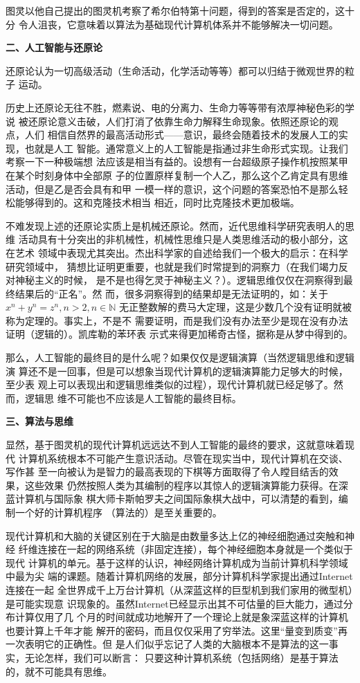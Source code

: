 图灵以他自己提出的图灵机考察了希尔伯特第十问题，得到的答案是否定的，这十分
令人沮丧，它意味着以算法为基础现代计算机体系并不能够解决一切问题。

\textbf{二、人工智能与还原论}

还原论认为一切高级活动（生命活动，化学活动等等）都可以归结于微观世界的粒子
运动。

历史上还原论无往不胜，燃素说、电的分离力、生命力等等带有浓厚神秘色彩的学说
被还原论意义击破，人们打消了依靠生命力解释生命现象。依照还原论的观点，人们
相信自然界的最高活动形式——意识，最终会随着技术的发展人工的实现，也就是人工
智能。通常意义上的人工智能是指通过非生命形式实现。让我们考察一下一种极端想
法应该是相当有益的。设想有一台超级原子操作机按照某甲在某个时刻身体中全部原
子的位置原样复制一个人乙，那么这个乙肯定具有思维活动，但是乙是否会具有和甲
一模一样的意识，这个问题的答案恐怕不是那么轻松能够得到的。这和克隆技术相当
相近，同时比克隆技术更加极端。

不难发现上述的还原论实质上是机械还原论。然而，近代思维科学研究表明人的思维
活动具有十分突出的非机械性，机械性思维只是人类思维活动的极小部分，这在艺术
领域中表现尤其突出。杰出科学家的自述给我们一个极大的启示：在科学研究领域中，
猜想比证明更重要，也就是我们时常提到的洞察力（在我们竭力反对神秘主义的时候，
是不是也得乞灵于神秘主义？）。逻辑思维仅仅在洞察得到最终结果后的“正名”。然
而，很多洞察得到的结果却是无法证明的，如：关于$x^n+y^n=z^n, n>2, n\in\mathbb{N}$
无正整数解的费马大定理，这是少数几个没有证明就被称为定理的。事实上，不是不
需要证明，而是我们没有办法至少是现在没有办法证明（逻辑的）。凯库勒的苯环表
示式来得更加稀奇古怪，据称是从梦中得到的。

那么，人工智能的最终目的是什么呢？如果仅仅是逻辑演算（当然逻辑思维和逻辑演
算还不是一回事，但是可以想象当现代计算机的逻辑演算能力足够大的时候，至少表
观上可以表现出和逻辑思维类似的过程），现代计算机就已经足够了。然而，逻辑思
维不可能也不应该是人工智能的最终目标。

\textbf{三、算法与思维}

显然，基于图灵机的现代计算机远远达不到人工智能的最终的要求，这就意味着现代
计算机系统根本不可能产生意识活动。尽管在现实当中，现代计算机在交谈、写作甚
至一向被认为是智力的最高表现的下棋等方面取得了令人瞠目结舌的效果，这些效果
仍然按照人类为其编制的程序以其惊人的逻辑演算能力获得。在深蓝计算机与国际象
棋大师卡斯帕罗夫之间国际象棋大战中，可以清楚的看到，编制一个好的计算机程序
（算法的）是至关重要的。

现代计算机和大脑的关键区别在于大脑是由数量多达上亿的神经细胞通过突触和神经
纤维连接在一起的网络系统（非固定连接），每个神经细胞本身就是一个类似于现代
计算机的单元。基于这样的认识，神经网络计算机成为当前计算机科学领域中最为尖
端的课题。随着计算机网络的发展，部分计算机科学家提出通过Internet连接在一起
全世界成千上万台计算机（从深蓝这样的巨型机到我们家用的微型机）是可能实现意
识现象的。虽然Internet已经显示出其不可估量的巨大能力，通过分布计算仅用了几
个月的时间就成功地解开了一个理论上就是象深蓝这样的计算机也要计算上千年才能
解开的密码，而且仅仅采用了穷举法。这里“量变到质变”再一次表明它的正确性。但
是人们似乎忘记了人类的大脑根本不是算法的这一事实，无论怎样，我们可以断言：
只要这种计算机系统（包括网络）是基于算法的，就不可能具有思维。

